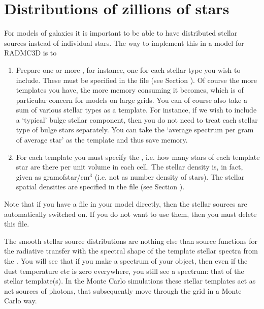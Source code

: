 \documentclass[letterpaper,10pt,english]{sphinxmanual}
\begin{document}
\section{Distributions of zillions of stars}
\label{\detokenize{stars:distributions-of-zillions-of-stars}}\label{\detokenize{stars:sec-distrib-of-stars}}
For models of galaxies it is important to be able to have distributed
stellar sources instead of individual stars. The way to implement this
in a model for RADMC\sphinxhyphen{}3D is to
\begin{enumerate}
%
\item {} 
Prepare one or more , for instance, one for each
stellar type you wish to include. These must be specified in the file
 (see Section
{\hyperref[\detokenize{inputoutputfiles:sec-stellarsrc-templates}]{}}). Of course the more templates you have, the
more memory consuming it becomes, which is of particular concern for models
on large grids. You can of course also take a sum of various stellar types as
a template. For instance, if we wish to include a ‘typical’ bulge stellar
component, then you do not need to treat each stellar type of bulge stars
separately. You can take the ‘average spectrum per gram of average star’ as
the template and thus save memory.

\item {} 
For each template you must specify the ,
i.e. how many stars of each template star are there per unit volume in
each cell. The stellar density is, in fact, given as gram\sphinxhyphen{}of\sphinxhyphen{}star/cm\(^3\)
(i.e. not as number density of stars). The stellar spatial densities
are specified in the file  (see
Section {\hyperref[\detokenize{inputoutputfiles:sec-stellarsrc-density}]{}}).

\end{enumerate}

Note that if you have a file  in your
model directly, then the stellar sources are automatically switched on.
If you do not want to use them, then you must delete this file.

The smooth stellar source distributions are nothing else than source
functions for the radiative transfer with the spectral shape of the template
stellar spectra from the .  You will
see that if you make a spectrum of your object, then even if the dust
temperature etc is zero everywhere, you still see a spectrum: that of the
stellar template(s). In the Monte Carlo simulations these stellar templates
act as net sources of photons, that subsequently move through the grid in a
Monte Carlo way.
\end{document}
